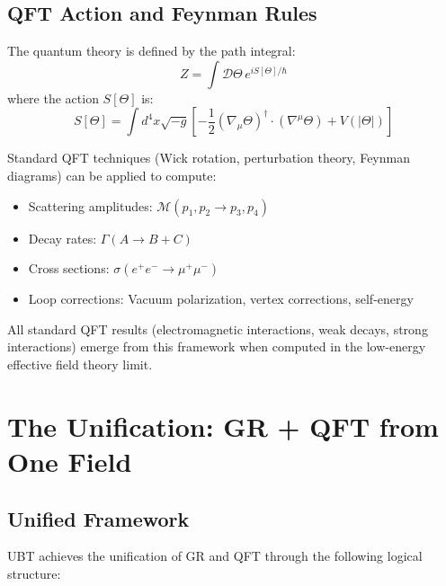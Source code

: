 \documentclass[12pt]{article}
\begin{document}
\subsection{QFT Action and Feynman Rules}

The quantum theory is defined by the path integral:
\begin{equation}
    Z = \int \mathcal{D}\Theta \, e^{iS[\Theta]/\hbar}
\end{equation}
where the action $S[\Theta]$ is:
\begin{equation}
    S[\Theta] = \int d^4x \sqrt{-g} \left[ -\frac{1}{2}(\nabla_\mu \Theta)^\dagger \cdot (\nabla^\mu \Theta) + V(|\Theta|) \right]
\end{equation}

Standard QFT techniques (Wick rotation, perturbation theory, Feynman diagrams) can be applied to compute:
\begin{itemize}
    \item Scattering amplitudes: $\mathcal{M}(p_1, p_2 \to p_3, p_4)$
    \item Decay rates: $\Gamma(A \to B + C)$
    \item Cross sections: $\sigma(e^+ e^- \to \mu^+ \mu^-)$
    \item Loop corrections: Vacuum polarization, vertex corrections, self-energy
\end{itemize}

All standard QFT results (electromagnetic interactions, weak decays, strong interactions) emerge from this framework when computed in the low-energy effective field theory limit.

\section{The Unification: GR + QFT from One Field}

\subsection{Unified Framework}

UBT achieves the unification of GR and QFT through the following logical structure:
\end{document}
